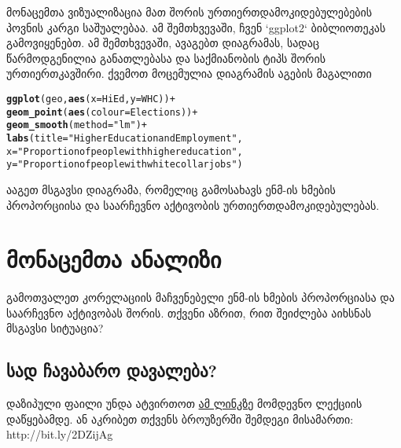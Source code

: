 \documentclass{article}\usepackage[]{graphicx}\usepackage[]{color}
\makeatletter
\newcommand{\hlstr}[1]{\textcolor[rgb]{0.192,0.494,0.8}{#1}}%
\newcommand{\hlopt}[1]{\textcolor[rgb]{0,0,0}{#1}}%
\newcommand{\hlstd}[1]{\textcolor[rgb]{0.345,0.345,0.345}{#1}}%
\newcommand{\hlkwc}[1]{\textcolor[rgb]{0.333,0.667,0.333}{#1}}%
\newcommand{\hlkwd}[1]{\textcolor[rgb]{0.737,0.353,0.396}{\textbf{#1}}}%
\newenvironment{kframe}{%
 \def\at@end@of@kframe{}%
 \ifinner\ifhmode%
  \def\at@end@of@kframe{\end{minipage}}%
  \begin{minipage}{\columnwidth}%
 \fi\fi%
 \def\FrameCommand##1{\hskip\@totalleftmargin \hskip-\fboxsep
 \colorbox{shadecolor}{##1}\hskip-\fboxsep
     \hskip-\linewidth \hskip-\@totalleftmargin \hskip\columnwidth}%
 \MakeFramed {\advance\hsize-\width
   \@totalleftmargin\z@ \linewidth\hsize
   \@setminipage}}%
 {\par\unskip\endMakeFramed%
 \at@end@of@kframe}
\newenvironment{knitrout}{}{} %
\makeatother
\begin{document}
მონაცემთა ვიზუალიზაცია მათ შორის ურთიერთდამოკიდებულებების პოვნის კარგი საშუალებაა. ამ შემთხვევაში, ჩვენ `ggplot2` ბიბლიოთეკას გამოვიყენებთ. ამ შემთხვევაში, ავაგებთ დიაგრამას, სადაც წარმოდგენილია განათლებასა და საქმიანობის ტიპს შორის ურთიერთკავშირი. ქვემოთ მოცემულია დიაგრამის აგების მაგალითი

\begin{knitrout}
\color{fgcolor}\begin{kframe}
\begin{alltt}
\hlkwd{ggplot}\hlstd{(geo,} \hlkwd{aes}\hlstd{(}\hlkwc{x}\hlstd{=HiEd,} \hlkwc{y}\hlstd{=WHC))}\hlopt{+}
  \hlkwd{geom_point}\hlstd{(}\hlkwd{aes}\hlstd{(}\hlkwc{colour}\hlstd{=Elections))}\hlopt{+}
  \hlkwd{geom_smooth}\hlstd{(}\hlkwc{method}\hlstd{=}\hlstr{"lm"}\hlstd{)}\hlopt{+}
  \hlkwd{labs}\hlstd{(}\hlkwc{title}\hlstd{=}\hlstr{"Higher Education and Employment"}\hlstd{,}
       \hlkwc{x}\hlstd{=}\hlstr{"Proportion of people with higher education"}\hlstd{,}
       \hlkwc{y} \hlstd{=}\hlstr{"Proportion of people with white collar jobs"}\hlstd{)}
\end{alltt}
\end{kframe}
\end{knitrout}

ააგეთ მსგავსი დიაგრამა, რომელიც გამოსახავს ენმ-ის ხმების პროპორციისა და საარჩევნო აქტივობის ურთიერთდამოკიდებულებას.

\section*{მონაცემთა ანალიზი}
\paragraph{}

გამოთვალეთ კორელაციის მაჩვენებელი ენმ-ის ხმების პროპორციასა და საარჩევნო აქტივობას შორის. თქვენი აზრით, რით შეიძლება აიხსნას მსგავსი სიტუაცია?



\subsection*{სად ჩავაბარო დავალება?}

დაზიპული ფაილი უნდა ატვირთოთ \href{https://www.dropbox.com/request/7lTQIfb0jRNoHoVhlPax}{ამ ლინკზე} მომდევნო ლექციის დაწყებამდე. ან აკრიბეთ თქვენს ბროუზერში შემდეგი მისამართი: http://bit.ly/2DZijAg
\end{document}
